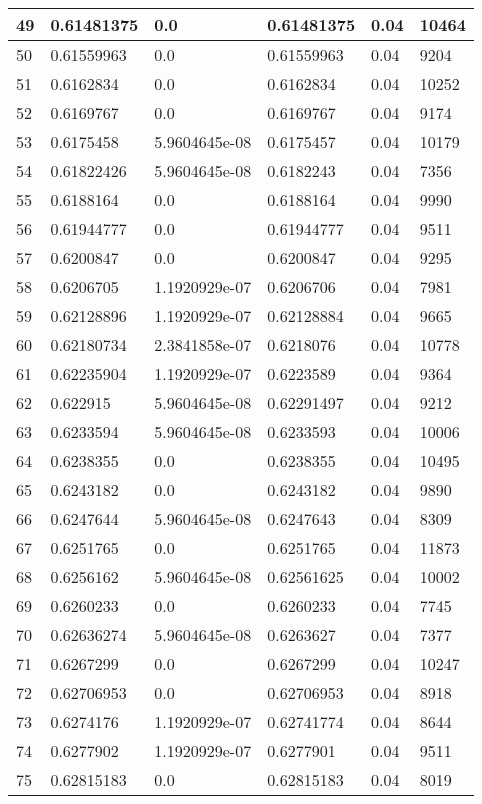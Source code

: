 \begin{longtable}{|l|l|l|l|l|l|}
49 & 0.61481375 & 0.0 & 0.61481375 & 0.04 & 10464 \\ \hline 
50 & 0.61559963 & 0.0 & 0.61559963 & 0.04 & 9204 \\ \hline 
51 & 0.6162834 & 0.0 & 0.6162834 & 0.04 & 10252 \\ \hline 
52 & 0.6169767 & 0.0 & 0.6169767 & 0.04 & 9174 \\ \hline 
53 & 0.6175458 & 5.9604645e-08 & 0.6175457 & 0.04 & 10179 \\ \hline 
54 & 0.61822426 & 5.9604645e-08 & 0.6182243 & 0.04 & 7356 \\ \hline 
55 & 0.6188164 & 0.0 & 0.6188164 & 0.04 & 9990 \\ \hline 
56 & 0.61944777 & 0.0 & 0.61944777 & 0.04 & 9511 \\ \hline 
57 & 0.6200847 & 0.0 & 0.6200847 & 0.04 & 9295 \\ \hline 
58 & 0.6206705 & 1.1920929e-07 & 0.6206706 & 0.04 & 7981 \\ \hline 
59 & 0.62128896 & 1.1920929e-07 & 0.62128884 & 0.04 & 9665 \\ \hline 
60 & 0.62180734 & 2.3841858e-07 & 0.6218076 & 0.04 & 10778 \\ \hline 
61 & 0.62235904 & 1.1920929e-07 & 0.6223589 & 0.04 & 9364 \\ \hline 
62 & 0.622915 & 5.9604645e-08 & 0.62291497 & 0.04 & 9212 \\ \hline 
63 & 0.6233594 & 5.9604645e-08 & 0.6233593 & 0.04 & 10006 \\ \hline 
64 & 0.6238355 & 0.0 & 0.6238355 & 0.04 & 10495 \\ \hline 
65 & 0.6243182 & 0.0 & 0.6243182 & 0.04 & 9890 \\ \hline 
66 & 0.6247644 & 5.9604645e-08 & 0.6247643 & 0.04 & 8309 \\ \hline 
67 & 0.6251765 & 0.0 & 0.6251765 & 0.04 & 11873 \\ \hline 
68 & 0.6256162 & 5.9604645e-08 & 0.62561625 & 0.04 & 10002 \\ \hline 
69 & 0.6260233 & 0.0 & 0.6260233 & 0.04 & 7745 \\ \hline 
70 & 0.62636274 & 5.9604645e-08 & 0.6263627 & 0.04 & 7377 \\ \hline 
71 & 0.6267299 & 0.0 & 0.6267299 & 0.04 & 10247 \\ \hline 
72 & 0.62706953 & 0.0 & 0.62706953 & 0.04 & 8918 \\ \hline 
73 & 0.6274176 & 1.1920929e-07 & 0.62741774 & 0.04 & 8644 \\ \hline 
74 & 0.6277902 & 1.1920929e-07 & 0.6277901 & 0.04 & 9511 \\ \hline 
75 & 0.62815183 & 0.0 & 0.62815183 & 0.04 & 8019 \\ \hline 
\end{longtable}